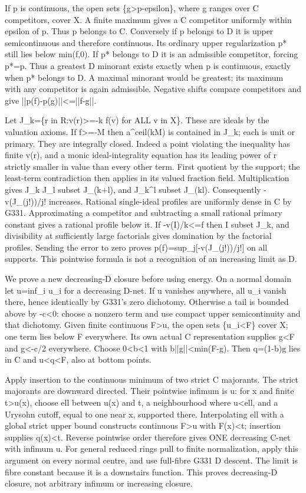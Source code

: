 \documentclass[11pt]{article}
\begin{document}
If p is continuous, the open sets \{g>p-epsilon\}, where g ranges over C competitors, cover X. A finite maximum gives a C competitor uniformly within epsilon of p. Thus p belongs to C. Conversely if p belongs to D it is upper semicontinuous and therefore continuous. Its ordinary upper regularization p* still lies below min(f,0). If p* belongs to D it is an admissible competitor, forcing p*=p. Thus a greatest D minorant exists exactly when p is continuous, exactly when p* belongs to D. A maximal minorant would be greatest: its maximum with any competitor is again admissible. Negative shifts compare competitors and give ||p(f)-p(g)||<=||f-g||.

Let J\_k=\{r in R:v(r)>=-k f(v) for ALL v in X\}. These are ideals by the valuation axioms. If f>=-M then a\textasciicircum{}ceil(kM) is contained in J\_k; each is unit or primary. They are integrally closed. Indeed a point violating the inequality has finite v(r), and a monic ideal-integrality equation has its leading power of r strictly smaller in value than every other term. First quotient by the support; the least-term contradiction then applies in its valued fraction field. Multiplication gives J\_k J\_l subset J\_(k+l), and J\_k\textasciicircum{}l subset J\_(kl). Consequently -v(J\_(j!))/j! increases. Rational single-ideal profiles are uniformly dense in C by G331. Approximating a competitor and subtracting a small rational primary constant gives a rational profile below it. If -v(I)/k<=f then I subset J\_k, and divisibility at sufficiently large factorials gives domination by the factorial profiles. Sending the error to zero proves p(f)=sup\_j[-v(J\_(j!))/j!] on all supports. This pointwise formula is not a recognition of an increasing limit as D.

We prove a new decreasing-D closure before using energy. On a normal domain let u=inf\_i u\_i for a decreasing D-net. If u vanishes anywhere, all u\_i vanish there, hence identically by G331's zero dichotomy. Otherwise a tail is bounded above by -c<0: choose a nonzero term and use compact upper semicontinuity and that dichotomy. Given finite continuous F>u, the open sets \{u\_i<F\} cover X; one term lies below F everywhere. Its own actual C representation supplies g<F and g<-c/2 everywhere. Choose 0<b<1 with b||g||<min(F-g). Then q=(1-b)g lies in C and u<q<F, also at bottom points.

Apply insertion to the continuous minimum of two strict C majorants. The strict majorants are downward directed. Their pointwise infimum is u: for x and finite t>u(x), choose ell between u(x) and t, a neighbourhood where u<ell, and a Urysohn cutoff, equal to one near x, supported there. Interpolating ell with a global strict upper bound constructs continuous F>u with F(x)<t; insertion supplies q(x)<t. Reverse pointwise order therefore gives ONE decreasing C-net with infimum u. For general reduced rings pull to finite normalization, apply this argument on every normal centre, and use full-fibre G331 D descent. The limit is fibre constant because it is a downstairs function. This proves decreasing-D closure, not arbitrary infimum or increasing closure.
\end{document}
